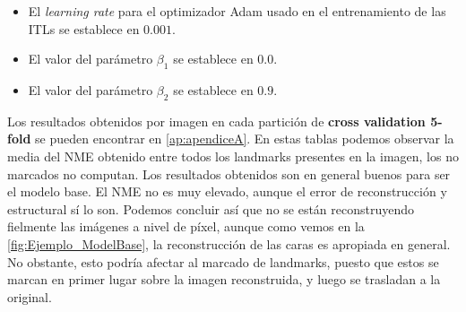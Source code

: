         \begin{itemize}
            \item El \textit{learning rate} para el optimizador Adam usado en el entrenamiento de las ITLs se establece en $0.001$. 
            \item El valor del parámetro $\beta_1$ se establece en $0.0$.
            \item El valor del parámetro $\beta_2$ se establece en $0.9$.
        \end{itemize}

        \noindent Los resultados obtenidos por imagen en cada partición de \textbf{cross validation 5-fold } se pueden encontrar en \autoref{ap:apendiceA}. En estas tablas podemos observar la media del NME obtenido entre todos los landmarks presentes en la imagen, los no marcados no computan. Los resultados obtenidos son en general buenos para ser el modelo base. El NME no es muy elevado, aunque el error de reconstrucción y estructural sí lo son. Podemos concluir así que no se están reconstruyendo fielmente las imágenes a nivel de píxel, aunque como vemos en la \autoref{fig:Ejemplo_ModelBase}, la reconstrucción de las caras es apropiada en general. No obstante, esto podría afectar al marcado de landmarks, puesto que estos se marcan en primer lugar sobre la imagen reconstruida, y luego se trasladan a la original.

